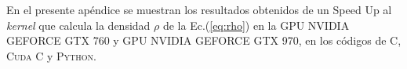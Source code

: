 \chapter{}
\label{ap_python}

En el presente apéndice se muestran los resultados obtenidos de un Speed Up al \textit{kernel} que calcula la densidad $\rho$ de la Ec.(\ref{eq:rho}) en la
GPU NVIDIA GEFORCE GTX 760 y GPU NVIDIA GEFORCE GTX 970, en los códigos de \textsc{C}, \textsc{Cuda C} y \textsc{Python}.







